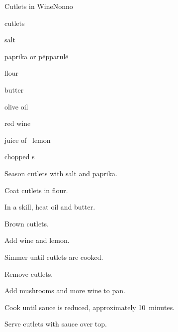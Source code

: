 \begin{recipe}{Cutlets in Wine}{Nonno}{}

\begin{ingredients}
\item {} cutlets
\item salt
\item paprika or p\"epparul\"e
\item flour
\item butter
\item olive oil
\item red wine
\item juice of \half{}~lemon
\item chopped s
\end{ingredients}

\begin{directions}
\item Season cutlets with salt and paprika.
\item Coat cutlets in flour.
\item In a skill, heat oil and butter.
\item Brown cutlets.
\item Add wine and lemon.
\item Simmer until cutlets are cooked.
\item Remove cutlets.
\item Add mushrooms and more wine to pan.
\item Cook until sauce is reduced, approximately 10~minutes.
\item Serve cutlets with sauce over top.
\end{directions}

\end{recipe}

